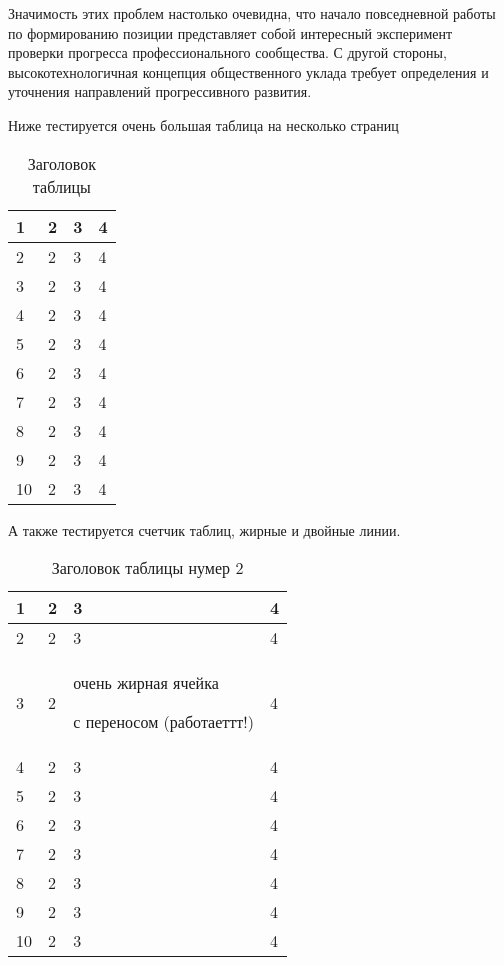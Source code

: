 Значимость этих проблем настолько очевидна, что начало повседневной работы по формированию позиции представляет собой интересный эксперимент проверки прогресса профессионального сообщества. С другой стороны, высокотехнологичная концепция общественного уклада требует определения и уточнения направлений прогрессивного развития.


Ниже тестируется очень большая таблица на несколько страниц

\begin{center}
    \begin{longtable}{|p{2cm}|p{3cm}|p{7cm}|p{3cm}|}
    \caption{Заголовок таблицы}\\
    \hline
    1 & 2 & 3 & 4\\ 
    \hline 
    2 & 2 & 3 & 4\\
    \hline
    3 & 2 & 3 & 4\\
    \hline
    4 & 2 & 3 & 4\\
    \hline
    5 & 2 & 3 & 4\\
    \hline
    6 & 2 & 3 & 4\\
    \hline
    7 & 2 & 3 & 4\\
    \hline
    8 & 2 & 3 & 4\\
    \hline
    9 & 2 & 3 & 4\\
    \hline
    10 & 2 & 3 & 4\\
    \hline
    
    
    \end{longtable}
\end{center}


А также тестируется счетчик таблиц, жирные и двойные линии.

\begin{center}
    \begin{longtable}{|p{2cm}||p{3cm}|p{7cm}|p{3cm}|}
    \caption{Заголовок таблицы нумер 2}\\
    \hline
    1 & 2 & 3 & 4\\ 
    \hline
    2 & 2 & 3 & 4\\
    \hline
    3 & 2 & очень жирная ячейка \par с переносом (работаеттт!) & 4\\
    \hline
    4 & 2 & 3 & 4\\
    \hline
    5 & 2 & 3 & 4\\
    \hline
    6 & 2 & 3 & 4\\
    \hline
    7 & 2 & 3 & 4\\
    \hline
    8 & 2 & 3 & 4\\
    \hline
    9 & 2 & 3 & 4\\
    \hline
    10 & 2 & 3 & 4\\
    \hline
    
    
    \end{longtable}
\end{center}


